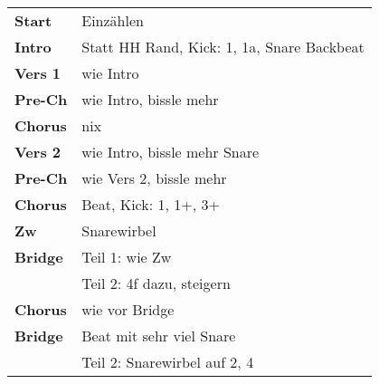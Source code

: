 
\begin{tabular}{p{1.6cm}l}
	\textbf{Start}  & Einzählen                                  \\
	\textbf{Intro}  & Statt HH Rand, Kick: 1, 1a, Snare Backbeat \\
	\textbf{Vers 1} & wie Intro                                  \\
	\textbf{Pre-Ch} & wie Intro, bissle mehr                     \\
	\textbf{Chorus} & nix                                        \\
	\textbf{Vers 2} & wie Intro, bissle mehr Snare               \\
	\textbf{Pre-Ch} & wie Vers 2, bissle mehr                    \\
	\textbf{Chorus} & Beat, Kick: 1, 1+, 3+                      \\
	\textbf{Zw}     & Snarewirbel                                \\
	\textbf{Bridge} & Teil 1: wie Zw                             \\
	                & Teil 2: 4f dazu, steigern                  \\
	\textbf{Chorus} & wie vor Bridge                             \\
	\textbf{Bridge} & Beat mit sehr viel Snare                   \\
	                & Teil 2: Snarewirbel auf 2, 4               \\
\end{tabular}